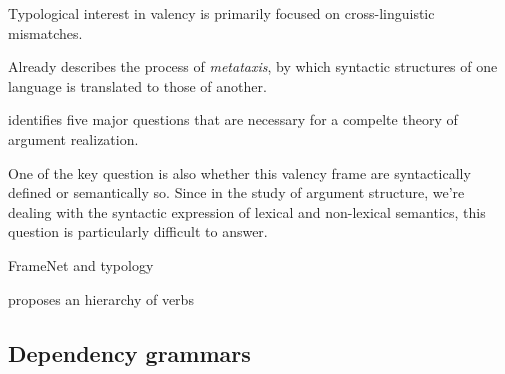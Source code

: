 Typological interest in valency is primarily focused on cross-linguistic mismatches.

Already \citet{tesniere1959} describes the process of \textit{metataxis}, by which syntactic structures of one language is translated to those of another.  

\citet{levin2005} identifies five major questions that are necessary for a compelte theory of argument realization.


One of the key question is also whether this valency frame are syntactically defined or semantically so. Since in the study of argument structure, we're dealing with the syntactic expression of lexical and non-lexical semantics, this question is particularly difficult to answer.


\cite{baker2020, ellsworth2021} FrameNet and typology

\citet{tsunoda1981, tsunoda1985} proposes an hierarchy of verbs



\subsection{Dependency grammars}



